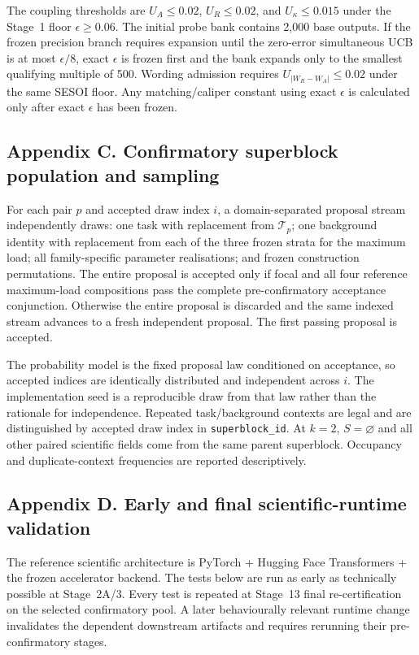 \documentclass[11pt,a4paper]{article}
\begin{document}
The coupling thresholds are $U_A\le0.02$, $U_R\le0.02$, and $U_\kappa\le0.015$ under the Stage~1 floor $\epsilon\ge0.06$. The initial probe bank contains 2,000 base outputs. If the frozen precision branch requires expansion until the zero-error simultaneous UCB is at most $\epsilon/8$, exact $\epsilon$ is frozen first and the bank expands only to the smallest qualifying multiple of 500. Wording admission requires $U_{|W_R-W_A|}\le0.02$ under the same SESOI floor. Any matching/caliper constant using exact $\epsilon$ is calculated only after exact $\epsilon$ has been frozen.

\subsection*{Appendix C. Confirmatory superblock population and sampling}
For each pair $p$ and accepted draw index $i$, a domain-separated proposal stream independently draws: one task with replacement from $\mathcal T_p$; one background identity with replacement from each of the three frozen strata for the maximum load; all family-specific parameter realisations; and frozen construction permutations. The entire proposal is accepted only if focal and all four reference maximum-load compositions pass the complete pre-confirmatory acceptance conjunction. Otherwise the entire proposal is discarded and the same indexed stream advances to a fresh independent proposal. The first passing proposal is accepted.

The probability model is the fixed proposal law conditioned on acceptance, so accepted indices are identically distributed and independent across $i$. The implementation seed is a reproducible draw from that law rather than the rationale for independence. Repeated task/background contexts are legal and are distinguished by accepted draw index in \texttt{superblock\_id}. At $k=2$, $S=\varnothing$ and all other paired scientific fields come from the same parent superblock. Occupancy and duplicate-context frequencies are reported descriptively.

\subsection*{Appendix D. Early and final scientific-runtime validation}
The reference scientific architecture is PyTorch + Hugging Face Transformers + the frozen accelerator backend. The tests below are run as early as technically possible at Stage~2A/3. Every test is repeated at Stage~13 final re-certification on the selected confirmatory pool. A later behaviourally relevant runtime change invalidates the dependent downstream artifacts and requires rerunning their pre-confirmatory stages.
\end{document}
